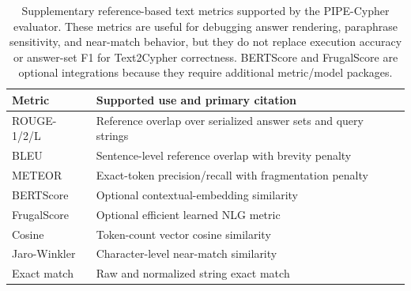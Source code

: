 \begin{table}[!htbp]
\centering
\scriptsize
\begin{tabular}{@{}p{}p{}@{}}
\toprule
Metric & Supported use and primary citation \\
\midrule
ROUGE-1/2/L & Reference overlap over serialized answer sets and query strings~\cite{lin-2004-rouge} \\
BLEU & Sentence-level reference overlap with brevity penalty~\cite{papineni-etal-2002-bleu} \\
METEOR & Exact-token precision/recall with fragmentation penalty~\cite{banerjee-lavie-2005-meteor} \\
BERTScore & Optional contextual-embedding similarity~\cite{zhang-etal-2020-bertscore} \\
FrugalScore & Optional efficient learned NLG metric~\cite{kamal-eddine-etal-2022-frugalscore} \\
Cosine & Token-count vector cosine similarity~\cite{manning-etal-2008-ir} \\
Jaro-Winkler & Character-level near-match similarity~\cite{jaro1989record,winkler1990string} \\
Exact match & Raw and normalized string exact match~\cite{rajpurkar-etal-2016-squad} \\
\bottomrule
\end{tabular}
\caption{Supplementary reference-based text metrics supported by the PIPE-Cypher evaluator. These metrics are useful for debugging answer rendering, paraphrase sensitivity, and near-match behavior, but they do not replace execution accuracy or answer-set F1 for Text2Cypher correctness. BERTScore and FrugalScore are optional integrations because they require additional metric/model packages.}
\label{tab:supported_text_metrics}
\end{table}
